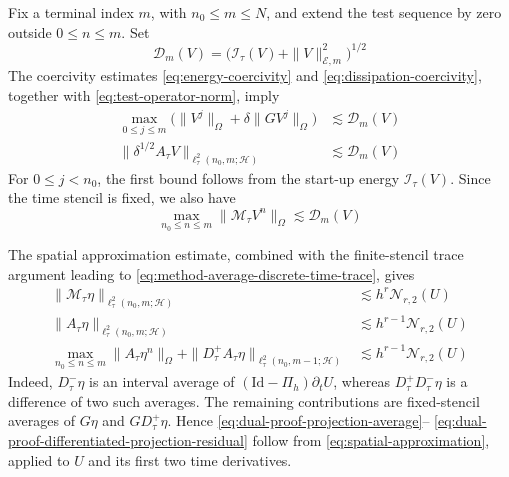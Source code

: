 \documentclass[11pt]{article}
\begin{document}
Fix a terminal index \(m\), with \(n_0\le m\le N\), and extend the test sequence
by zero outside \(0\le n\le m\). Set
\begin{equation}
\mathcal D_m(V)
=\bigl(\mathcal I_{\tau}(V)+\|V\|_{\mathcal E,m}^2\bigr)^{1/2} \label{eq:dual-proof-denominator}
\end{equation}
The coercivity estimates \eqref{eq:energy-coercivity} and
\eqref{eq:dissipation-coercivity}, together with
\eqref{eq:test-operator-norm}, imply
\begin{align}
\max_{0\le j\le m}
\bigl(\|V^j\|_{\Omega}+\delta\|GV^j\|_{\Omega}\bigr)
&\lesssim\mathcal D_m(V) \label{eq:dual-proof-graph-control}\\
\|\delta^{1/2}A_{\tau}V\|_{\ell_{\tau}^2(n_0,m;\mathcal H)}
&\lesssim\mathcal D_m(V) \label{eq:dual-proof-residual-control}
\end{align}
For \(0\le j<n_0\), the first bound follows from the start-up energy
\(\mathcal I_{\tau}(V)\). Since the time stencil is fixed, we also have
\begin{equation}
\max_{n_0\le n\le m}\|\mathcal M_{\tau}V^n\|_{\Omega}
\lesssim\mathcal D_m(V) \label{eq:dual-proof-average-control}
\end{equation}

The spatial approximation estimate, combined with the finite-stencil trace
argument leading to \eqref{eq:method-average-discrete-time-trace}, gives
\begin{align}
\|\mathcal M_{\tau}\eta\|_{\ell_{\tau}^2(n_0,m;\mathcal H)}
&\lesssim h^r\mathcal N_{r,2}(U) \label{eq:dual-proof-projection-average}\\
\|A_{\tau}\eta\|_{\ell_{\tau}^2(n_0,m;\mathcal H)}
&\lesssim h^{r-1}\mathcal N_{r,2}(U) \label{eq:dual-proof-projection-residual}\\
\max_{n_0\le n\le m}\|A_{\tau}\eta^n\|_{\Omega}
+\|D_{\tau}^{+}A_{\tau}\eta\|_{
\ell_{\tau}^2(n_0,m-1;\mathcal H)}
&\lesssim h^{r-1}\mathcal N_{r,2}(U) \label{eq:dual-proof-differentiated-projection-residual}
\end{align}
Indeed, \(D_{\tau}^{-}\eta\) is an interval average of
\((\mathrm{Id}-\Pi_h)\partial_tU\), whereas
\(D_{\tau}^{+}D_{\tau}^{-}\eta\) is a difference of two such averages. The
remaining contributions are fixed-stencil averages of \(G\eta\) and
\(G D_{\tau}^{+}\eta\). Hence
\eqref{eq:dual-proof-projection-average}--
\eqref{eq:dual-proof-differentiated-projection-residual} follow from
\eqref{eq:spatial-approximation}, applied to \(U\) and its first two time
derivatives.
\end{document}
